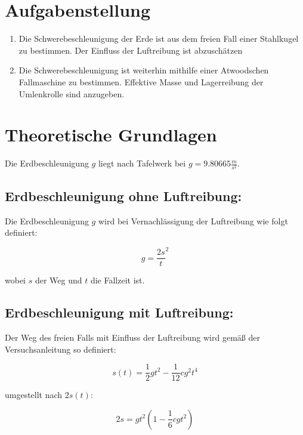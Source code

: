 \documentclass{protokoll}
\begin{document}
\section{Aufgabenstellung}


\begin{enumerate}
\item Die Schwerebeschleunigung der Erde ist aus dem freien Fall 
einer Stahlkugel zu bestimmen. Der Einfluss der Luftreibung 
ist abzuschätzen
\item Die Schwerebeschleunigung ist weiterhin mithilfe einer Atwoodschen 
Fallmaschine zu bestimmen. Effektive Masse und Lagerreibung der 
Umlenkrolle sind anzugeben.
\end{enumerate}


\section{Theoretische Grundlagen}

Die Erdbeschleunigung $g$ liegt nach Tafelwerk bei $g = 9.80665 \frac{m}{s^2}$.

\subsection{Erdbeschleunigung ohne Luftreibung:}


Die Erdbeschleunigung $g$ wird bei Vernachlässigung der Luftreibung wie folgt definiert:

\begin{equation}
 g = \frac{2s}{t}^2 
\end{equation}


wobei $s$ der Weg und $t$ die Fallzeit ist.


\subsection{Erdbeschleunigung mit Luftreibung:}


Der Weg des freien Falls mit Einfluss der Luftreibung 
wird gemäß der Versuchsanleitung so definiert:

\begin{equation}
 s(t) = \frac{1}{2} g t^2 - \frac{1}{12} c g^2 t^4 
\end{equation}

umgestellt nach $2s(t)$:

\begin{equation}
 2s = g t^2 (1 - \frac{1}{6} c g t^2) 
\end{equation}
\end{document}

